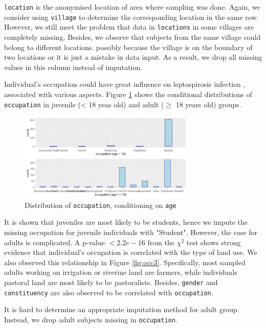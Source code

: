 \documentclass[11pt,twoside]{article}
\numberwithin{Theorem}{section}
\numberwithin{Definition}{section}
\numberwithin{Lemma}{section}
\numberwithin{Algorithm}{section}
\numberwithin{equation}{section}
\begin{document}
\texttt{location} is the anonymised location of area where sampling was done. Again, we consider using \texttt{village} to determine the corresponding location in the same row. However, we still meet the problem that data in \texttt{locations} in some villages are completely missing. Besides, we observe that subjects from the same village could belong to different locations. possibly because the village is on the boundary of two locations or it is just a mistake in data input. As a result, we drop all missing values in this column instead of imputation.

Individual's occupation could have great influence on leptospirosis infection \cite{cook2017risk}, associated with various aspects. Figure \ref{fig:occ1} shows the conditional distributions of \texttt{occupation} in juvenile (< 18 yeas old) and adult ($\geq$ 18 years old) groups. 

\begin{figure}[!h]
	\centering
	\includegraphics[width = 0.75\textwidth]{Images/occupation_age.png}
	\caption{Distribution of \texttt{occupation}, conditioning on \texttt{age}}
	\label{fig:occ1}
\end{figure}

It is shown that juveniles are most likely to be students, hence we impute the missing occupation for juvenile individuals with "Student". However, the case for adults is complicated. A p-value $<2.2e-16$ from the $\chi^2$ test shows strong evidence that individual's occupation is correlated with the type of land use. We also observed this relationship in Figure \ref{fig:occ3}. Specifically, most sampled adults working on irrigation or riverine land are farmers, while individuals pastoral land are most likely to be pastoralists. Besides, \texttt{gender} and \texttt{constituency} are also observed to be correlated with \texttt{occupation}. 

It is hard to determine an appropriate imputation method for adult group. Instead, we drop adult subjects missing in \texttt{occupation}.
\end{document}
